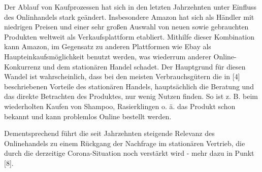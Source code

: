 Der Ablauf von Kaufprozessen hat sich in den letzten Jahrzehnten unter Einfluss des Onlinhandels stark geändert. Insbesondere Amazon hat sich als Händler mit niedrigen Preisen und einer sehr großen Auswahl von neuen sowie gebrauchten Produkten weltweit als Verkaufsplattform etabliert. Mithilfe dieser Kombination kann Amazon, im Gegensatz zu anderen Plattformen wie Ebay als Haupteinkaufsmöglichkeit benutzt werden, was wiederrum anderer Online-Konkurrenz und dem stationären Handel schadet. Der Hauptgrund für diesen Wandel ist wahrscheinlich, dass bei den meisten Verbrauchsgütern die in [4] beschriebenen Vorteile des stationären Handels\cite{n.a.}, hauptsächlich die Beratung und das direkte Betrachten des Produktes, nur wenig Nutzen finden. So ist z. B. beim wiederholten Kaufen von Shampoo, Rasierklingen o. ä. das Produkt schon bekannt und kann problemlos Online bestellt werden. 

\iffalse
    über zeit unkomplizierter geworden
    
    verbilligung des onlinehandels > prime-verlust
    amazon = vorreiter, aliexpress
    
    aliexpress: direkt von hersteller kaufen (https://www.emerald.com/insight/content/doi/10.1108/S1745-886220180000013014/full/pdf?title=italicamazon-and-alibabaitalic-internet-governance-business-models-and-internationalization-strategies 345)
\fi
Dementsprechend führt die seit Jahrzehnten steigende Relevanz des Onlinehandels zu einem Rückgang der Nachfrage im stationären Vertrieb\cite{Shankar}, die durch die derzeitige Corona-Situation noch verstärkt wird - mehr dazu in Punkt [8].

\iffalse
 Vorreiter in sachen niedrige Preise > ist sehr wichtig, weil
   viel einfacher vergelichbar, qualität des Produkts nicht einfach einsehbar: sie muss nicht außergewöhnlich, nur akzeptabel sein - jedoch auch nicht schlecht, da 14-tage-rückgabe ohne angabe eines grundes

 
 S 49 https://edoc.sub.uni-hamburg.de/hcu/volltexte/2017/370/pdf/Ebert_Kirsten.pdf
 danach: modell für veränderung
    
\fi
